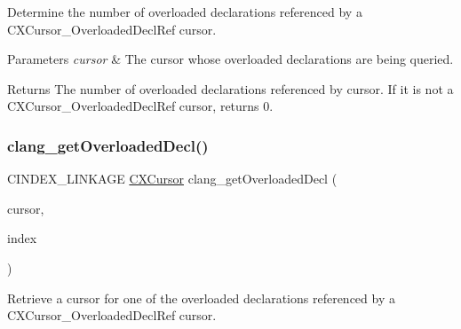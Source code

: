 Determine the number of overloaded declarations referenced by a {\ttfamily C\+X\+Cursor\+\_\+\+Overloaded\+Decl\+Ref} cursor. 


\begin{DoxyParams}{Parameters}
{\em cursor} & The cursor whose overloaded declarations are being queried.\\
\hline
\end{DoxyParams}
\begin{DoxyReturn}{Returns}
The number of overloaded declarations referenced by {\ttfamily cursor}. If it is not a {\ttfamily C\+X\+Cursor\+\_\+\+Overloaded\+Decl\+Ref} cursor, returns 0. 
\end{DoxyReturn}
\mbox{\label{group__CINDEX__TYPES_gab1c718b939700a6c23adfb9729c9c28f}} 
\subsubsection{\texorpdfstring{clang\+\_\+get\+Overloaded\+Decl()}{clang\_getOverloadedDecl()}}
{\footnotesize\ttfamily C\+I\+N\+D\+E\+X\+\_\+\+L\+I\+N\+K\+A\+GE \mbox{\hyperlink{structCXCursor}{C\+X\+Cursor}} clang\+\_\+get\+Overloaded\+Decl (\begin{DoxyParamCaption}\item[{\mbox{\hyperlink{structCXCursor}{C\+X\+Cursor}}}]{cursor,  }\item[{unsigned}]{index }\end{DoxyParamCaption})}



Retrieve a cursor for one of the overloaded declarations referenced by a {\ttfamily C\+X\+Cursor\+\_\+\+Overloaded\+Decl\+Ref} cursor. 


